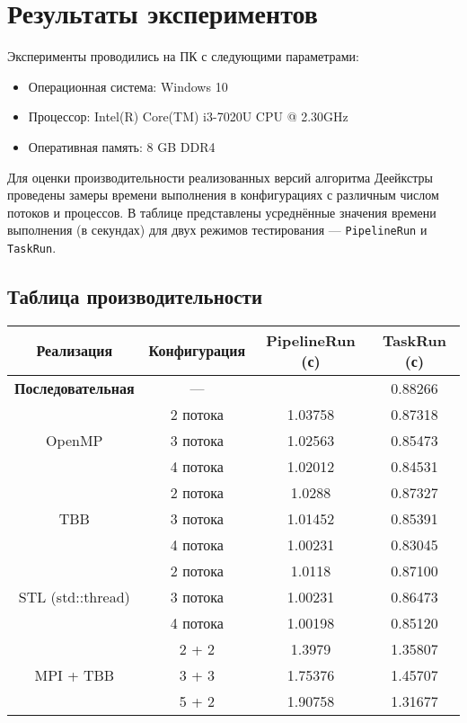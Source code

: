 \documentclass[12pt]{article}
\begin{document}
\section{Результаты экспериментов}
\hspace*{1.25em}Эксперименты проводились на ПК с следующими параметрами:

\begin{itemize}
    \item Операционная система: Windows 10
    \item Процессор: Intel(R) Core(TM) i3-7020U CPU @ 2.30GHz
    \item Оперативная память: 8 GB DDR4
\end{itemize}

\hspace*{1.25em}Для оценки производительности реализованных версий алгоритма Деейкстры  проведены замеры времени выполнения в конфигурациях с различным числом потоков и процессов. В таблице представлены усреднённые значения времени выполнения (в секундах) для двух режимов тестирования — \texttt{PipelineRun} и \texttt{TaskRun}.

\subsection{Таблица производительности}

\renewcommand{\arraystretch}{1.4}
\begin{table}[H]
\centering
\footnotesize
\begin{tabular}{|c|c|c|c|}
\hline
\textbf{Реализация} & \textbf{Конфигурация} & \textbf{PipelineRun (с)} & \textbf{TaskRun (с)} \\
\hline
\textbf{Последовательная} & — & \centering 1.03323 & 0.88266 \\
\hline
\multirow{3}{*}{OpenMP} 
  & 2 потока & 1.03758 & 0.87318 \\
  & 3 потока & 1.02563 & 0.85473 \\
  & 4 потока & 1.02012 & 0.84531 \\
\hline
\multirow{3}{*}{TBB} 
  & 2 потока & 1.0288 & 0.87327 \\
  & 3 потока & 1.01452 & 0.85391 \\
  & 4 потока & 1.00231 & 0.83045 \\
\hline
\multirow{3}{*}{STL (std::thread)} 
  & 2 потока & 1.0118 & 0.87100 \\
  & 3 потока & 1.00231 & 0.86473 \\
  & 4 потока & 1.00198 & 0.85120 \\
\hline
\multirow{5}{*}{MPI + TBB} 
  & 2 + 2 & 1.3979 & 1.35807 \\
  & 3 + 3 & 1.75376 & 1.45707 \\
  & 5 + 2 & 1.90758 & 1.31677 \\
\hline
\end{tabular}
\label{tab:parallel_perf}
\end{table}
\end{document}
